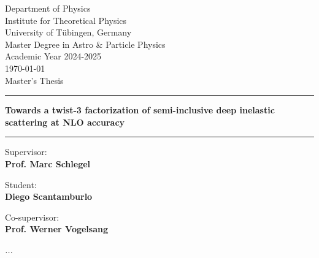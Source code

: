 
\thispagestyle{empty}
    
\begin{center}
   \vspace{1cm}
    \large{Department of Physics\\Institute for Theoretical Physics\\ University of Tübingen, Germany\\
   Master Degree in Astro \& Particle Physics\\
   Academic Year 2024-2025\\
   \today}\\
    \vspace*{1.5cm} 
    Master's Thesis
    \noindent\rule{\textwidth}{1pt}
   \noindent\textbf{\huge{Towards a twist-3 factorization of semi-inclusive deep inelastic scattering at NLO accuracy}}
   \rule{\textwidth}{1pt}
       
\end{center}

\vspace{20mm}

\noindent
\begin{minipage}[t]{0.45\textwidth} \raggedright 
{\Large Supervisor:\\ {\bf Prof. Marc Schlegel}}
\end{minipage}
\hfill
\begin{minipage}[t]{0.45\textwidth} \raggedleft
{\Large  Student: \\ {\bf Diego Scantamburlo}}
\end{minipage}
\vspace{5mm}

\noindent
\begin{minipage}[t]{0.55\textwidth}\raggedright 
{\Large Co-supervisor:\\ {\bf Prof. Werner Vogelsang}}
\end{minipage}

\vfill


\newpage
\textit{}
\newpage
\vspace{6cm}
\textit{...}
\newpage
\tableofcontents
\clearpage

\setcounter{page}{1} 
